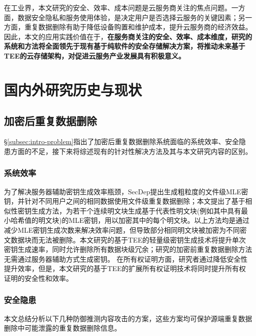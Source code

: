 在工业界，本文研究的安全、效率、成本问题是云服务商关注的焦点问题。一方面，数据安全隐私和服务使用体验，是决定用户是否选择云服务的关键因素；另一方面，重复数据删除有助于降低设备购置和维护成本，提升云服务商的经济效益。因此，本文的应用实践价值在于，\textbf{在服务商关注的安全、效率、成本维度，研究的系统和方法将全面领先于现有基于纯软件的安全存储解决方案，将推动未来基于TEE的云存储架构，对促进云服务产业发展具有积极意义。}

\section{国内外研究历史与现状}
\label{sec:compare}

\subsection{加密后重复数据删除}
\label{subsec:compare-deduplication}

\S\ref{subsec:intro-problem}指出了加密后重复数据删除系统面临的系统效率、安全隐患方面的不足，接下来将综述现有的针对性解决方法及其与本文研究内容的区别。

\subsubsection{系统效率}
\label{subsubsec:compare-deduplication-performance}

为了解决服务器辅助密钥生成效率瓶颈，SecDep\cite{zhou2015secdep}提出生成粗粒度的文件级MLE密钥，并针对不同用户之间的相同数据使用文件级重复数据删除；本文提出了基于相似性密钥生成方法\cite{qin17}，为若干个连续明文块生成基于代表性明文块(例如其中具有最小哈希值的明文块)的MLE密钥，用以加密其中的每个明文块。以上方法均是通过减少MLE密钥生成次数来解决效率问题，但导致部分相同明文块被加密为不同密文数据块而无法被删除。本文研究的基于TEE的轻量级密钥生成技术将提升单次密钥生成速率，同时允许删除所有数据块级冗余；研究的加密前重复数据删除方法无需通过服务器辅助方式生成密钥。
在所有权证明方面，研究者通过降低安全性提升效率\cite{xu2013weak,pietro12}，但是，本文研究的基于TEE的扩展所有权证明技术将同时提升所有权证明的安全性和效率。

\subsubsection{安全隐患}
\label{subsubsec:compare-deduplication-security}

本文总结分析以下几种防御推测内容攻击的方案，这些方案均可保护源端重复数据删除中可能泄露的重复数据删除信息。

